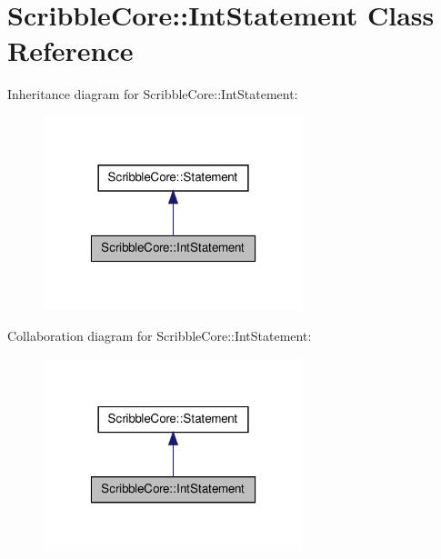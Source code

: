 \hypertarget{class_scribble_core_1_1_int_statement}{\section{Scribble\-Core\-:\-:Int\-Statement Class Reference}
\label{class_scribble_core_1_1_int_statement}
}


Inheritance diagram for Scribble\-Core\-:\-:Int\-Statement\-:
\nopagebreak
\begin{figure}[H]
\begin{center}
\leavevmode
\includegraphics[width=214pt]{class_scribble_core_1_1_int_statement__inherit__graph}
\end{center}
\end{figure}


Collaboration diagram for Scribble\-Core\-:\-:Int\-Statement\-:
\nopagebreak
\begin{figure}[H]
\begin{center}
\leavevmode
\includegraphics[width=214pt]{class_scribble_core_1_1_int_statement__coll__graph}
\end{center}
\end{figure}
